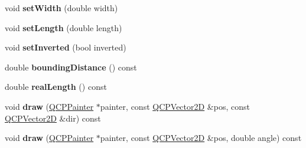 \begin{DoxyCompactItemize}
\item 
void {\bfseries set\+Width} (double width)\hypertarget{class_q_c_p_line_ending_a26dc020ea985a72cc25881ce2115e34e}{}\label{class_q_c_p_line_ending_a26dc020ea985a72cc25881ce2115e34e}

\item 
void {\bfseries set\+Length} (double length)\hypertarget{class_q_c_p_line_ending_ae36fa01763751cd64b7f56c3507e935a}{}\label{class_q_c_p_line_ending_ae36fa01763751cd64b7f56c3507e935a}

\item 
void {\bfseries set\+Inverted} (bool inverted)\hypertarget{class_q_c_p_line_ending_a580e4e2360b35ebb8d68f3494aa2335d}{}\label{class_q_c_p_line_ending_a580e4e2360b35ebb8d68f3494aa2335d}

\item 
double {\bfseries bounding\+Distance} () const \hypertarget{class_q_c_p_line_ending_a586b45cf738881a70119e353dc1ed59c}{}\label{class_q_c_p_line_ending_a586b45cf738881a70119e353dc1ed59c}

\item 
double {\bfseries real\+Length} () const \hypertarget{class_q_c_p_line_ending_a6a528e6dc5aabe1077a573b045715f03}{}\label{class_q_c_p_line_ending_a6a528e6dc5aabe1077a573b045715f03}

\item 
void {\bfseries draw} (\hyperlink{class_q_c_p_painter}{Q\+C\+P\+Painter} $\ast$painter, const \hyperlink{class_q_c_p_vector2_d}{Q\+C\+P\+Vector2D} \&pos, const \hyperlink{class_q_c_p_vector2_d}{Q\+C\+P\+Vector2D} \&dir) const \hypertarget{class_q_c_p_line_ending_a59582c35dcdc23456326b7aefc929e2b}{}\label{class_q_c_p_line_ending_a59582c35dcdc23456326b7aefc929e2b}

\item 
void {\bfseries draw} (\hyperlink{class_q_c_p_painter}{Q\+C\+P\+Painter} $\ast$painter, const \hyperlink{class_q_c_p_vector2_d}{Q\+C\+P\+Vector2D} \&pos, double angle) const \hypertarget{class_q_c_p_line_ending_a045afaf5c8fa77623271d60e5d338288}{}\label{class_q_c_p_line_ending_a045afaf5c8fa77623271d60e5d338288}

\end{DoxyCompactItemize}
